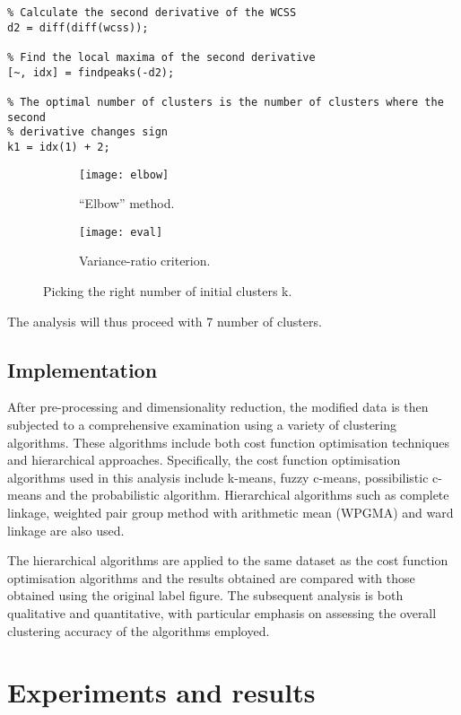 \documentclass[
  course = {{DS12E Clustering Algorithms}},
  quartile = {{2}},
  assignment = ,
  name = {{Michael Darmanis ; Vasilios Venieris}},
  studentnumber = {{7115152200004 ; 7115152200017}},
  email = {{mdarm@di.uoa.gr ; vvenieris@di.uoa.gr}},
  firstexercise = 1
]{aga-homework}
\begin{document}
\begin{verbatim}
% Calculate the second derivative of the WCSS
d2 = diff(diff(wcss));

% Find the local maxima of the second derivative
[~, idx] = findpeaks(-d2);

% The optimal number of clusters is the number of clusters where the second
% derivative changes sign
k1 = idx(1) + 2;
\end{verbatim}

\begin{figure}[htbp!]
\centering
\begin{subfigure}{0.45\textwidth}
    \texttt{[image: elbow]}
    \caption{``Elbow'' method.}
    \label{fig:elbow}
\end{subfigure}
\hfill
\begin{subfigure}{0.45\textwidth}
    \texttt{[image: eval]}
    \caption{Variance-ratio criterion.}
    \label{fig:eval}
\end{subfigure}
        
\caption{Picking the right number of initial clusters k.}
\label{fig:k-init}
\end{figure}

The analysis will thus proceed with 7 number of clusters.

\subsection{Implementation}

After pre-processing and dimensionality reduction, the modified data is then subjected to a comprehensive examination using a variety of clustering algorithms. These algorithms include both cost function optimisation techniques and hierarchical approaches. Specifically, the cost function optimisation algorithms used in this analysis include k-means, fuzzy c-means, possibilistic c-means and the probabilistic algorithm. Hierarchical algorithms such as complete linkage, weighted pair group method with arithmetic mean (WPGMA) and ward linkage are also used.

The hierarchical algorithms are applied to the same dataset as the cost function optimisation algorithms and the results obtained are compared with those obtained using the original label figure. The subsequent analysis is both qualitative and quantitative, with particular emphasis on assessing the overall clustering accuracy of the algorithms employed.

\section{Experiments and results}
\end{document}

